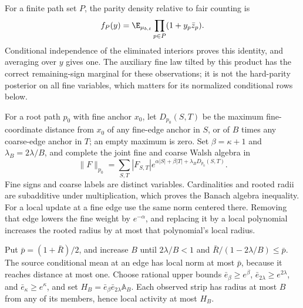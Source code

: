 For a finite path set \(P\), the parity density relative to fair counting
is
\begin{equation}
 f_P(y)=\E_{\mu_{b,t}}\prod_{p\in P}(1+y_p\bar z_p).
 \label{eq:rg-spatial-proof-soft-parity-density}
\end{equation}
Conditional independence of the eliminated interiors proves this identity,
and averaging over \(y\) gives one. The auxiliary fine law tilted by this
product has the correct remaining-sign marginal for these observations; it
is not the hard-parity posterior on all fine variables, which matters for
its normalized conditional rows below.

For a root path \(p_0\) with fine anchor \(x_0\), let \(D_{p_0}(S,T)\) be
the maximum fine-coordinate distance from \(x_0\) of any fine-edge anchor in
\(S\), or of \(B\) times any coarse-edge anchor in \(T\); an empty maximum
is zero. Set \(\beta=\kappa+1\) and \(\lambda_B=2\lambda/B\), and complete
the joint fine and coarse Walsh algebra in
\begin{equation}
 \|F\|_{p_0}=\sum_{S,T}|F_{S,T}|
     e^{\alpha|S|+\beta|T|+\lambda_BD_{p_0}(S,T)}.
 \label{eq:rg-spatial-proof-rooted-algebra}
\end{equation}
Fine signs and coarse labels are distinct variables. Cardinalities and
rooted radii are subadditive under multiplication, which proves the Banach
algebra inequality. For a local update at a fine edge use the same norm
centered there. Removing that edge lowers the fine weight by \(e^{-\alpha}\),
and replacing it by a local polynomial increases the rooted radius by at
most that polynomial's local radius.

Put \(\bar p=(1+\bar R)/2\), and increase \(B\) until \(2\lambda/B<1\) and
\(\bar R/(1-2\lambda/B)\le\bar p\). The source conditional mean at an edge
has local norm at most \(\bar p\), because it reaches distance at most one.
Choose rational upper bounds \(\bar e_\beta\ge e^\beta\),
\(\bar e_{2\lambda}\ge e^{2\lambda}\), and \(\bar e_\kappa\ge e^\kappa\),
and set \(H_B=\bar e_\beta\bar e_{2\lambda}\mathbb A_B\). Each observed
strip has radius at most \(B\) from any of its members, hence local
activity at most \(H_B\).

